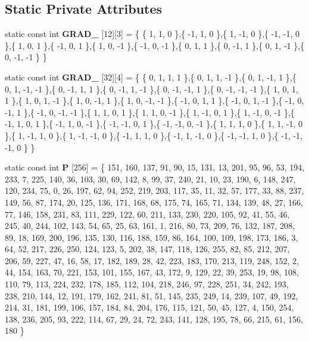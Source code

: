 \subsection*{Static Private Attributes}
\begin{DoxyCompactItemize}
\item 
\mbox{\label{classflounder_1_1noisesimplex_a3fa20131f685a17f458d1a438d9315d6}} 
static const int {\bfseries G\+R\+A\+D\+\_} \mbox{[}12\mbox{]}\mbox{[}3\mbox{]} = \{ \{ 1, 1, 0 \},\{ -\/1, 1, 0 \},\{ 1, -\/1, 0 \},\{ -\/1, -\/1, 0 \},\{ 1, 0, 1 \},\{ -\/1, 0, 1 \},\{ 1, 0, -\/1 \},\{ -\/1, 0, -\/1 \},\{ 0, 1, 1 \},\{ 0, -\/1, 1 \},\{ 0, 1, -\/1 \},\{ 0, -\/1, -\/1 \} \}
\item 
\mbox{\label{classflounder_1_1noisesimplex_a2f4afb1f7e2700c5324c738e39fa922e}} 
static const int {\bfseries G\+R\+A\+D\+\_} \mbox{[}32\mbox{]}\mbox{[}4\mbox{]} = \{ \{ 0, 1, 1, 1 \},\{ 0, 1, 1, -\/1 \},\{ 0, 1, -\/1, 1 \},\{ 0, 1, -\/1, -\/1 \},\{ 0, -\/1, 1, 1 \},\{ 0, -\/1, 1, -\/1 \},\{ 0, -\/1, -\/1, 1 \},\{ 0, -\/1, -\/1, -\/1 \},\{ 1, 0, 1, 1 \},\{ 1, 0, 1, -\/1 \},\{ 1, 0, -\/1, 1 \},\{ 1, 0, -\/1, -\/1 \},\{ -\/1, 0, 1, 1 \},\{ -\/1, 0, 1, -\/1 \},\{ -\/1, 0, -\/1, 1 \},\{ -\/1, 0, -\/1, -\/1 \},\{ 1, 1, 0, 1 \},\{ 1, 1, 0, -\/1 \},\{ 1, -\/1, 0, 1 \},\{ 1, -\/1, 0, -\/1 \},\{ -\/1, 1, 0, 1 \},\{ -\/1, 1, 0, -\/1 \},\{ -\/1, -\/1, 0, 1 \},\{ -\/1, -\/1, 0, -\/1 \},\{ 1, 1, 1, 0 \},\{ 1, 1, -\/1, 0 \},\{ 1, -\/1, 1, 0 \},\{ 1, -\/1, -\/1, 0 \},\{ -\/1, 1, 1, 0 \},\{ -\/1, 1, -\/1, 0 \},\{ -\/1, -\/1, 1, 0 \},\{ -\/1, -\/1, -\/1, 0 \} \}
\item 
\mbox{\label{classflounder_1_1noisesimplex_ae53c7b8b5ba9878dd75e6b1b87a6dba0}} 
static const int {\bfseries P} \mbox{[}256\mbox{]} = \{ 151, 160, 137, 91, 90, 15, 131, 13, 201, 95, 96, 53, 194, 233, 7, 225, 140, 36, 103, 30, 69, 142, 8, 99, 37, 240, 21, 10, 23, 190, 6, 148, 247, 120, 234, 75, 0, 26, 197, 62, 94, 252, 219, 203, 117, 35, 11, 32, 57, 177, 33, 88, 237, 149, 56, 87, 174, 20, 125, 136, 171, 168, 68, 175, 74, 165, 71, 134, 139, 48, 27, 166, 77, 146, 158, 231, 83, 111, 229, 122, 60, 211, 133, 230, 220, 105, 92, 41, 55, 46, 245, 40, 244, 102, 143, 54, 65, 25, 63, 161, 1, 216, 80, 73, 209, 76, 132, 187, 208, 89, 18, 169, 200, 196, 135, 130, 116, 188, 159, 86, 164, 100, 109, 198, 173, 186, 3, 64, 52, 217, 226, 250, 124, 123, 5, 202, 38, 147, 118, 126, 255, 82, 85, 212, 207, 206, 59, 227, 47, 16, 58, 17, 182, 189, 28, 42, 223, 183, 170, 213, 119, 248, 152, 2, 44, 154, 163, 70, 221, 153, 101, 155, 167, 43, 172, 9, 129, 22, 39, 253, 19, 98, 108, 110, 79, 113, 224, 232, 178, 185, 112, 104, 218, 246, 97, 228, 251, 34, 242, 193, 238, 210, 144, 12, 191, 179, 162, 241, 81, 51, 145, 235, 249, 14, 239, 107, 49, 192, 214, 31, 181, 199, 106, 157, 184, 84, 204, 176, 115, 121, 50, 45, 127, 4, 150, 254, 138, 236, 205, 93, 222, 114, 67, 29, 24, 72, 243, 141, 128, 195, 78, 66, 215, 61, 156, 180 \}

\end{DoxyCompactItemize}
